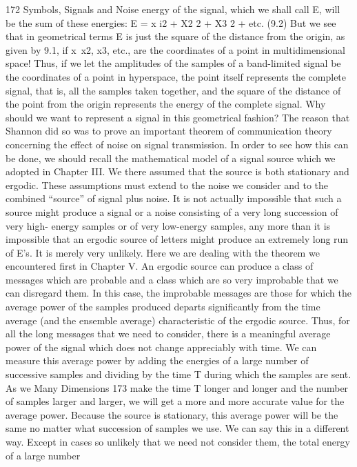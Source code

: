 {{{{{{{{{{172 Symbols, Signals and Noise
energy of the signal, which we shall call E, will be the sum of
these energies:
E = x i2 + X2 2 + X3 2 + etc. (9.2)
But we see that in geometrical terms E is just the square of the
distance from the origin, as given by 9.1, if x\, x2, x3, etc., are the
coordinates of a point in multidimensional space!
Thus, if we let the amplitudes of the samples of a band-limited
signal be the coordinates of a point in hyperspace, the point itself
represents the complete signal, that is, all the samples taken
together, and the square of the distance of the point from the origin
represents the energy of the complete signal.
Why should we want to represent a signal in this geometrical
fashion? The reason that Shannon did so was to prove an important
theorem of communication theory concerning the effect of
noise on signal transmission.
In order to see how this can be done, we should recall the
mathematical model of a signal source which we adopted in
Chapter III. We there assumed that the source is both stationary
and ergodic. These assumptions must extend to the noise we consider
and to the combined “source” of signal plus noise.
It is not actually impossible that such a source might produce a
signal or a noise consisting of a very long succession of very high-
energy samples or of very low-energy samples, any more than it is
impossible that an ergodic source of letters might produce an
extremely long run of E’s. It is merely very unlikely. Here we are
dealing with the theorem we encountered first in Chapter V. An
ergodic source can produce a class of messages which are probable
and a class which are so very improbable that we can disregard
them. In this case, the improbable messages are those for which
the average power of the samples produced departs significantly
from the time average (and the ensemble average) characteristic
of the ergodic source.
Thus, for all the long messages that we need to consider, there
is a meaningful average power of the signal which does not change
appreciably with time. We can measure this average power by
adding the energies of a large number of successive samples and
dividing by the time T during which the samples are sent. As we
Many Dimensions
173
make the time T longer and longer and the number of samples
larger and larger, we will get a more and more accurate value for
the average power. Because the source is stationary, this average
power will be the same no matter what succession of samples
we use.
We can say this in a different way. Except in cases so unlikely
that we need not consider them, the total energy of a large number
}}}}}}}}}}
